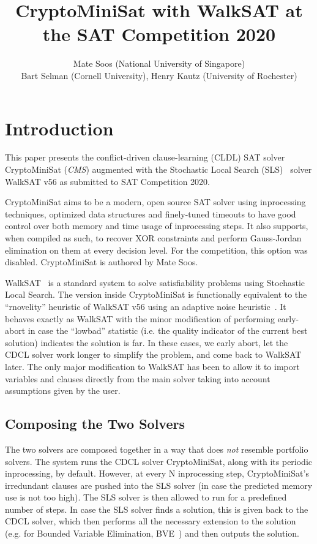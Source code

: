 \documentclass[final]{ieee}
\begin{document}
\title{CryptoMiniSat with WalkSAT at the SAT Competition 2020}
\author{Mate Soos (National University of Singapore)\\
Bart Selman (Cornell University), Henry Kautz (University of Rochester)}

\maketitle
\thispagestyle{empty}
\pagestyle{empty}

\section{Introduction}
This paper presents the conflict-driven clause-learning (CLDL) SAT solver CryptoMiniSat (\emph{CMS}) augmented with the Stochastic Local Search (SLS)~\cite{Selman95localsearch} solver WalkSAT v56 as submitted to SAT Competition 2020.

CryptoMiniSat aims to be a modern, open source SAT solver using inprocessing techniques, optimized data structures and finely-tuned timeouts to have good control over both memory and time usage of inprocessing steps. It also supports, when compiled as such, to recover XOR constraints and perform Gauss-Jordan elimination on them at every decision level. For the competition, this option was disabled. CryptoMiniSat is authored by Mate Soos.

WalkSAT~\cite{DBLP:conf/aaai/KautzS96} is a standard system to solve satisfiability problems using Stochastic Local Search. The version inside CryptoMiniSat is functionally equivalent to the ``rnovelity'' heuristic of WalkSAT v56 using an adaptive noise heuristic~\cite{DBLP:conf/aaai/Hoos02}. It behaves exactly as WalkSAT with the minor modification of performing early-abort in case the ``lowbad'' statistic (i.e. the quality indicator of the current best solution) indicates the solution is far. In these cases, we early abort, let the CDCL solver work longer to simplify the problem, and come back to WalkSAT later. The only major modification to WalkSAT has been to allow it to import variables and clauses directly from the main solver taking into account assumptions given by the user.

\subsection{Composing the Two Solvers}
The two solvers are composed together in a way that does \emph{not} resemble portfolio solvers. The system runs the CDCL solver CryptoMiniSat, along with its periodic inprocessing, by default. However, at every N inprocessing step, CryptoMiniSat's irredundant clauses are pushed into the SLS solver (in case the predicted memory use is not too high). The SLS solver is then allowed to run for a predefined number of steps. In case the SLS solver finds a solution, this is given back to the CDCL solver, which then performs all the necessary extension to the solution (e.g. for Bounded Variable Elimination, BVE~\cite{BVE}) and then outputs the solution.
\end{document}
